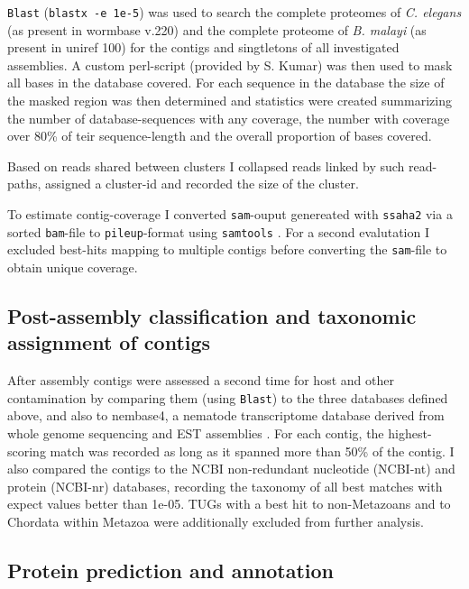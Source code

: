 \texttt{Blast} (\texttt{blastx -e 1e-5}) was used to search the
complete proteomes of \textit{C. elegans} (as present in wormbase
v.220) and the complete proteome of \textit{B. malayi} (as present in
uniref 100) for the contigs and singtletons of all investigated
assemblies. A custom perl-script (provided by S. Kumar) was then used
to mask all bases in the database covered. For each sequence in the
database the size of the masked region was then determined and
statistics were created summarizing the number of database-sequences
with any coverage, the number with coverage over 80\% of teir
sequence-length and the overall proportion of bases covered.

Based on reads shared between clusters I collapsed reads linked by
such read-paths, assigned a cluster-id and recorded the size of the
cluster.

To estimate contig-coverage I converted \texttt{sam}-ouput genereated
with \texttt{ssaha2}\cite{pmid11591649} via a sorted \texttt{bam}-file
to \texttt{pileup}-format using \texttt{samtools}
\cite{journals/bioinformatics/LiHWFRHMAD09}. For a second evalutation
I excluded best-hits mapping to multiple contigs before converting the
\texttt{sam}-file to obtain unique coverage.

\subsection{Post-assembly classification and taxonomic assignment of
  contigs}

After assembly contigs were assessed a second time for host and other
contamination by comparing them (using \texttt{Blast}) to the three
databases defined above, and also to nembase4, a nematode
transcriptome database derived from whole genome sequencing and EST
assemblies \cite{parkinson_nembase:resource_2004, pmid21550347}. For
each contig, the highest-scoring match was recorded as long as it
spanned more than 50\% of the contig. I also compared the contigs to
the NCBI non-redundant nucleotide (NCBI-nt) and protein (NCBI-nr)
databases, recording the taxonomy of all best matches with expect
values better than 1e-05. TUGs with a best hit to non-Metazoans and to
Chordata within Metazoa were additionally excluded from further
analysis.

\subsection{Protein prediction and annotation}

